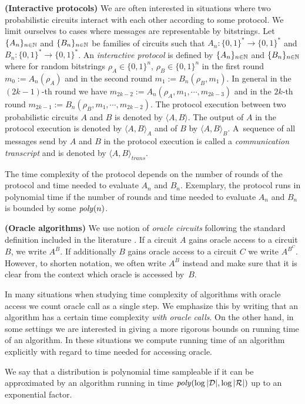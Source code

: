 \textbf{(Interactive protocols)}
We are often interested in situations where two probabilistic circuits interact with each other according to some protocol.
We limit ourselves to cases where messages are representable by bitstrings.
Let $\{A_n\}_{n \in \mathbb{N}}$ and $\{B_n\}_{n \in \mathbb{N}}$ be families of circuits such that $A_n : \{0,1\}^{*} \rightarrow \{0,1\}^{*}$ and $B_n : \{0,1\}^{*} \rightarrow \{0,1\}^{*}$.
An \textit{interactive protocol} is defined by $\{A_n\}_{n \in \mathbb{N}}$ and $\{B_n\}_{n \in \mathbb{N}}$ where
for random bitstrings $\rho_A \in \{0,1\}^{n}$, $\rho_B \in \{0,1\}^{n}$ in the first round $m_0 := A_n(\rho_A)$ and in the second round $m_1 := B_n(\rho_B, m_1)$.
In general in the $(2k\!-\!1)$-th round we have $m_{2k-2} := A_n(\rho_A, m_1, \cdots, m_{2k-3})$ and in the $2k$-th round $m_{2k-1} := B_n(\rho_B, m_1, \cdots, m_{2k-2})$.
The protocol execution between two probabilistic circuits $A$ and $B$ is denoted by $\langle A, B \rangle$.
The output of $A$ in the protocol execution is denoted by $\langle A, B \rangle_A$ and of $B$ by $\langle A, B \rangle_B$.
A~sequence of all messages send by $A$ and $B$ in the protocol execution is called a \textit{communication transcript} and
is denoted by $\langle A, B \rangle_{\mathit{trans}}$.

The time complexity of the protocol depends on the number of rounds of the protocol
and time needed to evaluate $A_n$ and $B_n$.
Exemplary, the protocol runs in polynomial time if the number of rounds and time needed to evaluate $A_n$ and $B_n$ is bounded by some $\operatorname{\mathit{poly}}(n)$.

\textbf{(Oracle algorithms)}
We use notion of \textit{oracle circuits} following the standard definition included in the literature \cite{Goldreich:2004:FCV:975541}.
If a circuit $A$ gains oracle access to a circuit $B$, we write $A^{B}$. If additionally $B$ gains oracle access to a circuit $C$
we write $A^{B^C}$. However, to shorten notation, we often write $A^{B}$ instead and make sure that it is clear from the context which oracle is accessed by~$B$.

In many situations when studying time complexity of algorithms with oracle access we count oracle call as a single step.
We emphasize this by writing that an algorithm has a certain time complexity \textit{with oracle calls}.
On the other hand, in some settings we are interested in giving a more rigorous bounds on running time of an algorithm.
In these situations we compute running time of an algorithm explicitly with regard to time needed for accessing oracle.
\begin{definition}
We say that a distribution is \textnormal{polynomial time sampleable} if it can be approximated by an algorithm running in time $\mathit{poly}(\log|\mathcal{D}|, \log|\mathcal{R}|)$
up to an exponential factor.
\end{definition}


